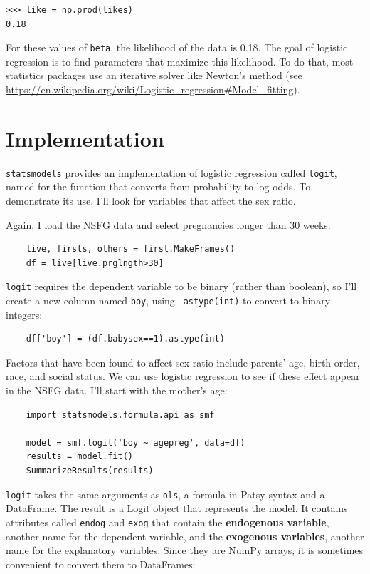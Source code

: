 \documentclass[12pt]{book}
\begin{document}
\begin{verbatim}
>>> like = np.prod(likes)
0.18
\end{verbatim}

For these values of {\tt beta}, the likelihood of the data is 0.18.
The goal of logistic regression is to find parameters that maximize
this likelihood.  To do that, most statistics packages use an
iterative solver like Newton's method (see
\url{https://en.wikipedia.org/wiki/Logistic_regression#Model_fitting}).


\section{Implementation}
\label{implementation}

{\tt statsmodels} provides an implementation of logistic regression
called {\tt logit}, named for the function that converts from
probability to log-odds.  To demonstrate its use, I'll look for
variables that affect the sex ratio.

Again, I load the NSFG data and select pregnancies longer than
30 weeks:

\begin{verbatim}
    live, firsts, others = first.MakeFrames()
    df = live[live.prglngth>30]
\end{verbatim}

{\tt logit} requires the dependent variable to be binary (rather than
boolean), so I'll create a new column named {\tt boy}, using {\tt
  astype(int)} to convert to binary integers:

\begin{verbatim}
    df['boy'] = (df.babysex==1).astype(int)
\end{verbatim}

Factors that have been found to affect sex ratio include parents'
age, birth order, race, and social status.  We can use logistic
regression to see if these effect appear in the NSFG data.  I'll
start with the mother's age:

\begin{verbatim}
    import statsmodels.formula.api as smf

    model = smf.logit('boy ~ agepreg', data=df)
    results = model.fit()
    SummarizeResults(results)
\end{verbatim}

{\tt logit} takes the same arguments as {\tt ols}, a formula
in Patsy syntax and a DataFrame.  The result is a Logit object
that represents the model.  It contains attributes called
{\tt endog} and {\tt exog} that contain the {\bf endogenous
variable}, another name for the dependent variable,
and the {\bf exogenous variables}, another name for the
explanatory variables.  Since they are NumPy arrays, it is
sometimes convenient to convert them to DataFrames:
\end{document}
